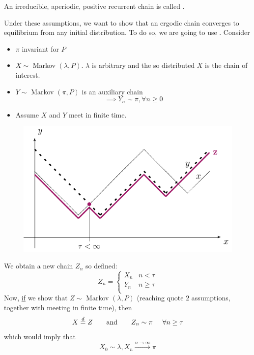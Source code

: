 \documentclass{article}
\begin{document}
\begin{definition}
    An irreducible, aperiodic, positive recurrent chain is called .
\end{definition}
Under these assumptions, we want to show that an ergodic chain converges to equilibrium from any initial distribution. To do so, we are going to use . Consider
\begin{itemize}
    \item $\pi$ invariant for $P$
    \item $X \sim$ Markov $(\lambda, P)$. $\lambda$ is arbitrary and the so distributed $X$ is the chain of interest.
    \item $Y \sim$ Markov $(\pi, P)$ is an auxiliary chain
    \[\implies Y_n \sim \pi, \forall n \geq 0\]
    \item Assume $X$ and $Y$ meet in finite time.
\end{itemize}
\begin{figure}[H]
    \centering
    \includegraphics{standalones/pdfs/coupling}
\end{figure}
We obtain a new chain $Z_n$ so defined:
\[
Z_n = 
\begin{cases}
    X_n & n<\tau \\
    Y_n & n \geq \tau \\
\end{cases}
\]
Now, \underline{if} we show that $Z \sim$ Markov $(\lambda, P)$ (reaching quote $2$ assumptions, together with meeting in finite time), then 
\[
    X \stackrel{d}= Z \qquad\text{and}\qquad
    Z_n \sim \pi \hspace{0.5 cm} \forall n \geq \tau\]
which would imply that 
\begin{equation*}
    X_0 \sim \lambda, X_n \xrightarrow{n \rightarrow \infty} \pi 
\end{equation*}
\end{document}
